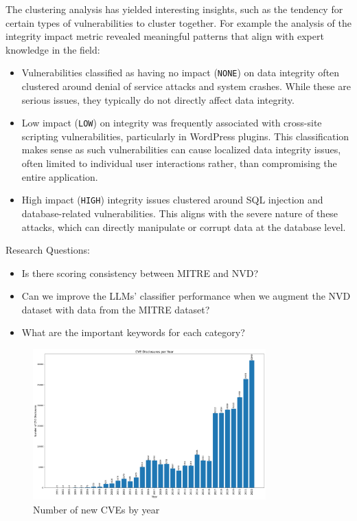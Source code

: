 \documentclass[12pt]{article}
\begin{document}
The clustering analysis has yielded interesting insights, such as the tendency for certain types of
vulnerabilities to cluster together. For example the analysis of the integrity impact metric revealed meaningful patterns that align with expert knowledge in the field:

\begin{itemize}

	\item Vulnerabilities classified as having no impact (\texttt{NONE}) on data integrity often
	      clustered around denial of service attacks and system crashes. While these are serious
	      issues, they typically do not directly affect data integrity.

	\item Low impact (\texttt{LOW}) on integrity was frequently associated with cross-site scripting
	      vulnerabilities, particularly in WordPress plugins. This classification makes sense as such
	      vulnerabilities can cause localized data integrity issues, often limited to individual user
	      interactions rather, than compromising the entire application.

	\item High impact (\texttt{HIGH}) integrity issues clustered around SQL injection and
	      database-related vulnerabilities. This aligns with the severe nature of these attacks, which
	      can directly manipulate or corrupt data at the database level.

\end{itemize}

Research Questions:

\begin{itemize}
	\item Is there scoring consistency between MITRE and NVD?

	\item Can we improve the LLMs' classifier performance when we augment the NVD dataset with data
	      from the MITRE dataset?

	\item What are the important keywords for each category?
\end{itemize}



\begin{figure}[t] \centering
	\includegraphics[width=0.8\textwidth]{figures/cves_per_year.pdf}
	\caption{\label{fig:cves_per_year}Number of new CVEs by year}
\end{figure}
\end{document}
